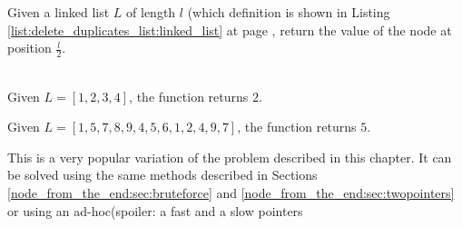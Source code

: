 \begin{exercise}
Given a linked list $L$ of length $l$ (which definition is shown in Listing \ref{list:delete_duplicates_list:linked_list} at page \pageref{list:delete_duplicates_list:linked_list} , return the value of the node at position $\frac{l}{2}$.
\begin{example}
	\hfill \\
	Given $L=[1,2,3,4]$, the function returns $2$.
\end{example}

\begin{example}
	Given $L=[1,5,7,8,9,4,5,6,1,2,4,9,7]$, the function returns $5$.
\end{example}
\end{exercise}
This is a very popular variation of the problem described in this chapter. It can be solved using the same methods described in Sections \ref{node_from_the_end:sec:bruteforce} and \ref{node_from_the_end:sec:twopointers} or using an ad-hoc(spoiler: a fast and a slow pointers